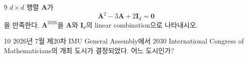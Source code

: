 \documentclass[11pt,oneside]{article}
\begin{document}
\begin{problem}{9}
$d\times d$ 행렬 $\mathbf{A}$가
\[
    \mathbf{A}^2-3\mathbf{A}+2\mathbf{I}_d=\mathbf{0}
\]
을 만족한다. $\mathbf{A}^{2026}$을 $\mathbf{A}$와 $\mathbf{I}_d$의 linear combination으로 나타내시오.
\end{problem}

\begin{problem}{10}
2026년 7월 제20차 IMU General Assembly에서 2030 International Congress of Mathematicians의 개최 도시가 결정되었다. 어느 도시인가?
\end{problem}
\end{document}
